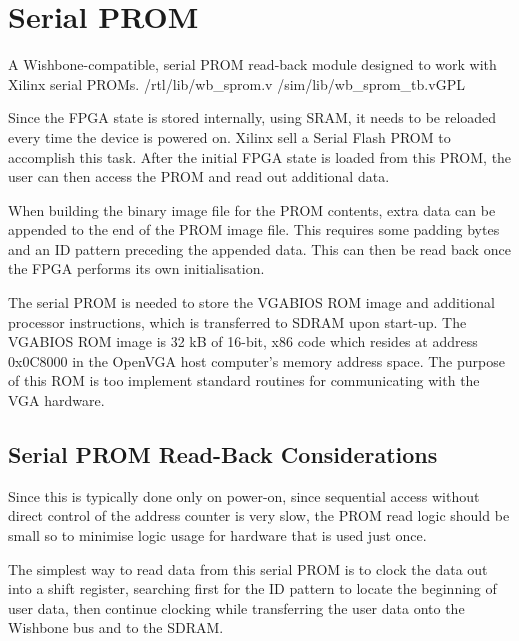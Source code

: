 \section{Serial PROM}
\label{Serial_PROM}

{A Wishbone-compatible, serial PROM read-back module designed to work with Xilinx
serial PROMs.} {/rtl/lib/wb\_sprom.v} {/sim/lib/wb\_sprom\_tb.v}{GPL}

Since the FPGA state is stored internally, using SRAM, it needs to be reloaded
every time the device is powered on. Xilinx sell a Serial Flash PROM to
accomplish this task. After the initial FPGA state is loaded from this PROM,
the user can then access the PROM and read out additional data.

When building the binary image file for the PROM contents, extra data can be
appended to the end of the PROM image file. This requires some padding
bytes and an ID pattern preceding the appended data. This can then be read back
once the FPGA performs its own initialisation.

The serial PROM is needed to store the VGABIOS ROM image and additional
processor instructions, which is transferred to SDRAM upon start-up. The VGABIOS
ROM image is 32 kB of 16-bit, x86 code which resides at address 0x0C8000 in the
OpenVGA host computer's memory address space\cite{SVGA_Book}. The purpose of
this ROM is too implement standard routines for communicating with the VGA hardware.


\subsection{Serial PROM Read-Back Considerations}
Since this is typically done only on power-on, since sequential access without
direct control of the address counter is very slow, the PROM read logic should
be small so to minimise logic usage for hardware that is used just once.

The simplest way to read data from this serial PROM is to clock the data out
into a shift register, searching first for the ID pattern to locate the
beginning of user data, then continue clocking while transferring the user data
onto the Wishbone bus and to the SDRAM.
